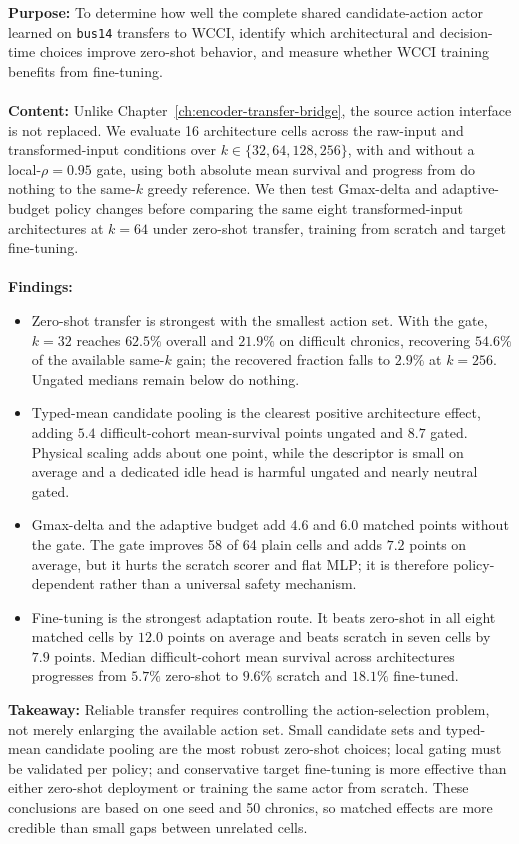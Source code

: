 \begin{tcolorbox}[
  colframe=red!75!black,
  colback=red!5!white,
  title=Chapter 10 Summary: Complete-Policy Transfer and Adaptation]
\textbf{Purpose:} To determine how well the complete shared
candidate-action actor learned on \texttt{bus14} transfers to WCCI, identify
which architectural and decision-time choices improve zero-shot behavior, and
measure whether WCCI training benefits from fine-tuning.
\\
\\
\textbf{Content:} Unlike Chapter~\ref{ch:encoder-transfer-bridge},
the source action interface is not replaced. We evaluate 16 architecture cells
across the raw-input and transformed-input conditions over
$k\in\{32,64,128,256\}$, with and without a local-$\rho=0.95$ gate, using both
absolute mean survival and progress from do nothing to the same-$k$ greedy
reference. We then test Gmax-delta and adaptive-budget policy changes before
comparing the same eight transformed-input architectures at $k=64$ under
zero-shot transfer, training from scratch and target fine-tuning.
\\
\\
\textbf{Findings:}
\begin{itemize}
  \item Zero-shot transfer is strongest with the smallest action set. With the
  gate, $k=32$ reaches $62.5\%$ overall and $21.9\%$ on difficult chronics,
  recovering $54.6\%$ of the available same-$k$ gain; the recovered fraction
  falls to $2.9\%$ at $k=256$. Ungated medians remain below do nothing.
  \item Typed-mean candidate pooling is the clearest positive architecture effect,
  adding $5.4$ difficult-cohort mean-survival points ungated and $8.7$ gated. Physical
  scaling adds about one point, while the descriptor is small on average and a
  dedicated idle head is harmful ungated and nearly neutral gated.
  \item Gmax-delta and the adaptive budget add $4.6$ and $6.0$ matched points
  without the gate. The gate improves 58 of 64 plain cells and adds $7.2$ points
  on average, but it hurts the scratch scorer and flat MLP; it is therefore
  policy-dependent rather than a universal safety mechanism.
  \item Fine-tuning is the strongest adaptation route. It beats zero-shot in
  all eight matched cells by $12.0$ points on average and beats scratch in seven
  cells by $7.9$ points. Median difficult-cohort mean survival across architectures progresses from
  $5.7\%$ zero-shot to $9.6\%$ scratch and $18.1\%$ fine-tuned.
\end{itemize}
\textbf{Takeaway:} Reliable transfer requires controlling the action-selection
problem, not merely enlarging the available action set. Small candidate sets
and typed-mean candidate pooling are the most robust zero-shot choices; local gating must
be validated per policy; and conservative target fine-tuning is more effective
than either zero-shot deployment or training the same actor from scratch. These
conclusions are based on one seed and 50 chronics, so matched effects are more
credible than small gaps between unrelated cells.
\end{tcolorbox}
